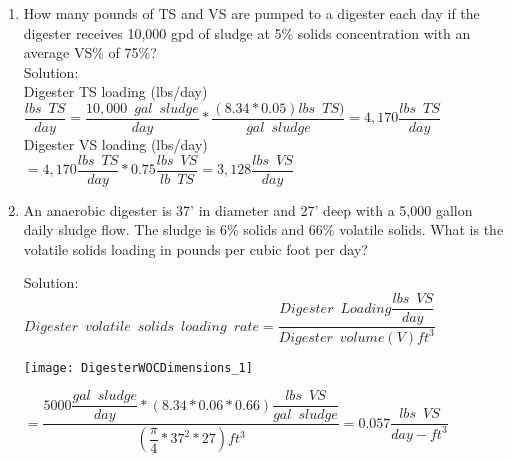 				\begin{enumerate}
					\item How many pounds of TS and VS are pumped to a digester each day if the digester receives 10,000 gpd of sludge at 5\% solids concentration with an average VS\% of 75\%?\\
					Solution:\\

					Digester TS loading (lbs/day)\\
					\vspace{0.3cm}
						$
							\dfrac{lbs \enspace TS}{day}
							=
							\dfrac{10,000 \enspace gal \enspace sludge}{day}
							*
							\dfrac{(8.34*0.05) lbs \enspace TS )}{gal \enspace sludge}
							=4,170
							\dfrac{lbs \enspace TS}{day}
						$
						\\
						\vspace{0.3cm}
						Digester VS loading (lbs/day)\\
						\vspace{0.3cm}
						$=4,170 	\dfrac{lbs \enspace TS}{day}*0.75\dfrac{lbs \enspace VS}{lb \enspace TS}=\boxed{3,128 \dfrac{lbs \enspace VS}{day}}$
						\vspace{0.5cm}
						\item An anaerobic digester is 37’ in diameter and 27’ deep with a 5,000 gallon daily sludge flow. The sludge is 6\% solids and 66\% volatile solids.  What is the volatile solids loading in pounds per cubic foot per day?
							
							
						Solution:\\
						{
						$
							Digester \enspace volatile \enspace solids 			\enspace loading \enspace rate = 					\dfrac
							{
							Digester \enspace Loading 
								\dfrac
								{
								lbs \enspace VS
								}
								{
								day
								}
							}
							{
							Digester \enspace volume (V)ft^3
							}
						$
						}\\
						\begin{center}
						\texttt{[image: DigesterWOCDimensions\_1]}
						\end{center}

						{
						$=\dfrac
							{
								5000
								\dfrac
									{gal \enspace sludge}
									{day}
								*(8.34*0.06*0.66) 
								\dfrac
									{lbs \enspace VS}
									{gal \enspace  sludge}
							}
							{
								(\dfrac
									{\pi}
									{4}*37^2*27)ft^3
							}
						=\boxed
							{
								0.057 \dfrac
									{lbs \enspace VS}
									{day-ft^3}
							}
						$}
				\end{enumerate}
